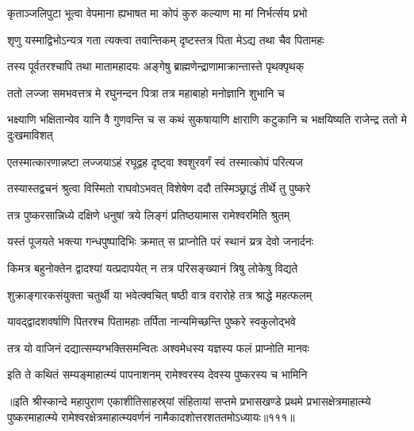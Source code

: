 \twolineshloka
{कृताञ्जलिपुटा भूत्वा वेपमाना ह्यभाषत}
{मा कोपं कुरु कल्याण मा मां निर्भर्त्सय प्रभो}%

\twolineshloka
{शृणु यस्माद्विभोऽन्यत्र गता त्यक्त्वा तवान्तिकम्}
{दृष्टस्तत्र पिता मेऽद्य तथा चैव पितामहः}%

\twolineshloka
{तस्य पूर्वतरश्चापि तथा मातामहादयः}
{अङ्गेषु ब्राह्मणेन्द्राणामाक्रान्तास्ते पृथक्पृथक्}%

\twolineshloka
{ततो लज्जा समभवत्तत्र मे रघुनन्दन}
{पित्रा तत्र महाबाहो मनोज्ञानि शुभानि च}%

\threelineshloka
{भक्ष्याणि भक्षितान्येव यानि वै गुणवन्ति च}
{स कथं सुकषायाणि क्षाराणि कटुकानि च}
{भक्षयिष्यति राजेन्द्र ततो मे दुःखमाविशत्}%

\twolineshloka
{एतस्मात्कारणान्नष्टा लज्जयाऽहं रघूद्वह}
{दृष्ट्वा श्वशुरवर्गं स्वं तस्मात्कोपं परित्यज}%

\twolineshloka
{तस्यास्तद्वचनं श्रुत्वा विस्मितो राघवोऽभवत्}
{विशेषेण ददौ तस्मिञ्छ्राद्धं तीर्थे तु पुष्करे}%

\twolineshloka
{तत्र पुष्करसान्निध्ये दक्षिणे धनुषां त्रये}
{लिङ्गं प्रतिष्ठयामास रामेश्वरमिति श्रुतम्}%

\twolineshloka
{यस्तं पूजयते भक्त्या गन्धपुष्पादिभिः क्रमात्}
{स प्राप्नोति परं स्थानं य्रत्र देवो जनार्दनः}%

\twolineshloka
{किमत्र बहुनोक्तेन द्वादश्यां यत्प्रदापयेत्}
{न तत्र परिसङ्ख्यानं त्रिषु लोकेषु विद्यते}%

\twolineshloka
{शुक्राङ्गारकसंयुक्ता चतुर्थी या भवेत्क्वचित्}
{षष्ठी वात्र वरारोहे तत्र श्राद्धे महत्फलम्}%

\twolineshloka
{यावद्द्वादशवर्षाणि पितरश्च पितामहाः}
{तर्पिता नान्यमिच्छन्ति पुष्करे स्वकुलोद्भवे}%

\twolineshloka
{तत्र यो वाजिनं दद्यात्सम्यग्भक्तिसमन्वितः}
{अश्वमेधस्य यज्ञस्य फलं प्राप्नोति मानवः}%

\twolineshloka
{इति ते कथितं सम्यङ्माहात्म्यं पापनाशनम्}
{रामेश्वरस्य देवस्य पुष्करस्य च भामिनि}%

॥इति श्रीस्कान्दे महापुराण एकाशीतिसाहस्र्यां संहितायां सप्तमे प्रभासखण्डे प्रथमे प्रभासक्षेत्रमाहात्म्ये पुष्करमाहात्म्ये रामेश्वरक्षेत्रमाहात्म्यवर्णनं नामैकादशोत्तरशततमोऽध्यायः॥१११॥